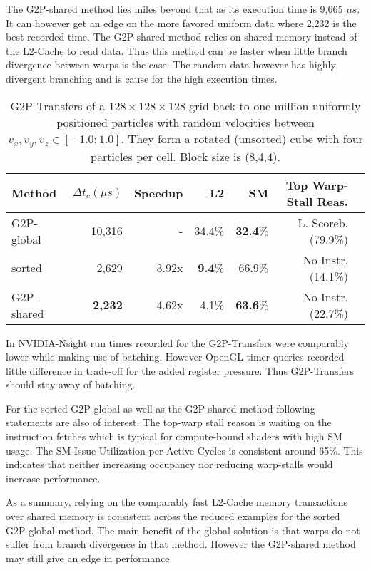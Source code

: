 \documentclass[m,times]{cgMA}
\begin{document}
The G2P-shared method lies miles beyond that as its execution time is 9,665 $\mu s$. It can however get an edge on the more favored uniform data where 2,232 is the best recorded time. The G2P-shared method relies on shared memory instead of the L2-Cache to read data. Thus this method can be faster when little branch divergence between warps is the case. The random data however has highly divergent branching and is cause for the high execution times.

\begin{table}[htpb]
  \begin{tabular}{ | l | r | r | r | r | r | r |}    \hline
    Method                 &  $\Delta t_c(\mu s)$ &Speedup         & L2   &SM             & Top Warp-Stall Reas.\\\hline
    G2P-global             &   10,316             &-               &34.4\%&\textbf{32.4}\%         & L. Scoreb.(79.9\%) \\\hline
    sorted                 &    2,629		  &3.92x           &\textbf{9.4}\%&66.9\%          & No Instr.(14.1\%) \\\hline
    G2P-shared             &    \textbf{2,232}             &4.62x           &4.1\% &\textbf{63.6}\%& No Instr.(22.7\%) \\\hline
 \end{tabular}
 \caption{G2P-Transfers of a $128\times 128\times128$ grid back to one million uniformly positioned particles with random velocities between $v_x,v_y,v_z \in [-1.0;1.0]$. They form a rotated (unsorted) cube with four particles per cell. Block size is (8,4,4).}\label{table:g2p_uniform4}
\end{table}

In NVIDIA-Nsight run times recorded for the G2P-Transfers were comparably lower while making use of batching. However OpenGL timer queries recorded little difference in trade-off for the added register pressure. Thus G2P-Transfers should stay away of batching.

For the sorted G2P-global as well as the G2P-shared method following statements are also of interest. The top-warp stall reason is waiting on the instruction fetches which is typical for compute-bound shaders with high SM usage. The SM Issue Utilization per Active Cycles is consistent around 65\%. This indicates that neither increasing occupancy nor reducing warp-stalls would increase performance.

As a summary, relying on the comparably fast L2-Cache memory transactions over shared memory is consistent across the reduced examples for the sorted G2P-global method. The main benefit of the global solution is that warps do not suffer from branch divergence in that method. However the G2P-shared method may still give an edge in performance.
\end{document}

